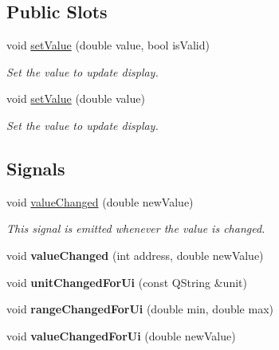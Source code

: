 \subsection*{Public Slots}
\begin{DoxyCompactItemize}
\item 
void \hyperlink{classmdt_analog_io_aefdee4a9c33e5939f8ee7d599c959567}{setValue} (double value, bool isValid)
\begin{DoxyCompactList}\small\item\em Set the value to update display. \end{DoxyCompactList}\item 
void \hyperlink{classmdt_analog_io_a9729875cb13fa2069e40c9abce914870}{setValue} (double value)
\begin{DoxyCompactList}\small\item\em Set the value to update display. \end{DoxyCompactList}\end{DoxyCompactItemize}
\subsection*{Signals}
\begin{DoxyCompactItemize}
\item 
\hypertarget{classmdt_analog_io_ad658090469cc6b69fa92d9bca73d8a16}{
void \hyperlink{classmdt_analog_io_ad658090469cc6b69fa92d9bca73d8a16}{valueChanged} (double newValue)}
\label{classmdt_analog_io_ad658090469cc6b69fa92d9bca73d8a16}

\begin{DoxyCompactList}\small\item\em This signal is emitted whenever the value is changed. \end{DoxyCompactList}\item 
\hypertarget{classmdt_analog_io_ab45b4b94be2a4bedf59e09ea7f60e09e}{
void {\bfseries valueChanged} (int address, double newValue)}
\label{classmdt_analog_io_ab45b4b94be2a4bedf59e09ea7f60e09e}

\item 
\hypertarget{classmdt_analog_io_aa81b49605f601850ecfa780f2b758e98}{
void {\bfseries unitChangedForUi} (const QString \&unit)}
\label{classmdt_analog_io_aa81b49605f601850ecfa780f2b758e98}

\item 
\hypertarget{classmdt_analog_io_a40735cbbf852790067a6f9b57aac4aa3}{
void {\bfseries rangeChangedForUi} (double min, double max)}
\label{classmdt_analog_io_a40735cbbf852790067a6f9b57aac4aa3}

\item 
\hypertarget{classmdt_analog_io_aaef16a200f5a862356eaeb4a65a1e06f}{
void {\bfseries valueChangedForUi} (double newValue)}
\label{classmdt_analog_io_aaef16a200f5a862356eaeb4a65a1e06f}

\end{DoxyCompactItemize}
